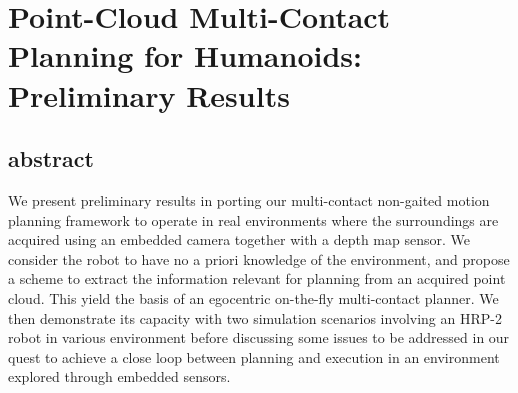 

\chapter{
Point-Cloud Multi-Contact Planning for Humanoids:\\ Preliminary Results
}



\section{abstract}

We present preliminary results in porting our multi-contact non-gaited motion planning framework to operate in real environments where the surroundings are acquired using an embedded camera together with a depth map sensor. %
We consider the robot to have no a priori knowledge of the environment, and propose a scheme to extract the information relevant for planning from an acquired point cloud. This yield the basis of an egocentric on-the-fly multi-contact planner. We then demonstrate its capacity with two simulation scenarios involving an HRP-2 robot in various environment before discussing some issues to be addressed in our quest to achieve a close loop between planning and execution in an environment explored through embedded sensors.


